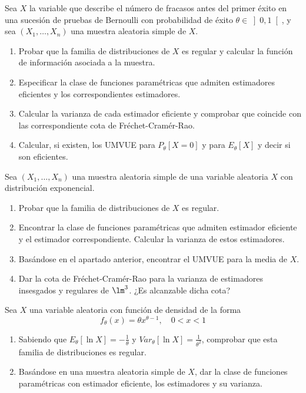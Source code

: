 \begin{ejercicio} %
    Sea $X$ la variable que describe el número de fracasos antes del primer éxito en una sucesión de pruebas de Bernoulli con probabilidad de éxito $\theta\in \left]0,1\right[$, y sea $(X_1, \ldots, X_n)$ una muestra aleatoria simple de $X$.
    \begin{enumerate}[label=\alph*)]
        \item Probar que la familia de distribuciones de $X$ es regular y calcular la función de información asociada a la muestra.
        \item Especificar la clase de funciones paramétricas que admiten estimadores eficientes y los correspondientes estimadores.
        \item Calcular la varianza de cada estimador eficiente y comprobar que coincide con las correspondiente cota de Fréchet-Cramér-Rao.
        \item Calcular, si existen, los UMVUE para $P_\theta[X=0]$ y para $E_\theta[X]$ y decir si son eficientes.
    \end{enumerate}
\end{ejercicio}

\begin{ejercicio} %
    Sea $(X_1, \ldots, X_n)$ una muestra aleatoria simple de una variable aleatoria $X$ con distribución exponencial.
    \begin{enumerate}[label=\alph*)]
        \item Probar que la familia de distribuciones de $X$ es regular.
        \item Encontrar la clase de funciones paramétricas que admiten estimador eficiente y el estimador correspondiente. Calcular la varianza de estos estimadores.
        \item Basándose en el apartado anterior, encontrar el UMVUE para la media de $X$.
        \item Dar la cota de Fréchet-Cramér-Rao para la varianza de estimadores insesgados y regulares de $\lm^3$. ¿Es alcanzable dicha cota?
    \end{enumerate}
\end{ejercicio}

\begin{ejercicio} %
    Sea $X$ una variable aleatoria con función de densidad de la forma
    \begin{equation*}
        f_\theta(x) = \theta x^{\theta-1}, \quad 0<x<1
    \end{equation*}
    \begin{enumerate}[label=\alph*)]
        \item Sabiendo que $E_\theta[\ln X] = -\frac{1}{\theta}$ y $Var_\theta[\ln X] = \frac{1}{\theta^2}$, comprobar que esta familia de distribuciones es regular.
        \item Basándose en una muestra aleatoria simple de $X$, dar la clase de funciones paramétricas con estimador eficiente, los estimadores y su varianza.
    \end{enumerate}
\end{ejercicio}
